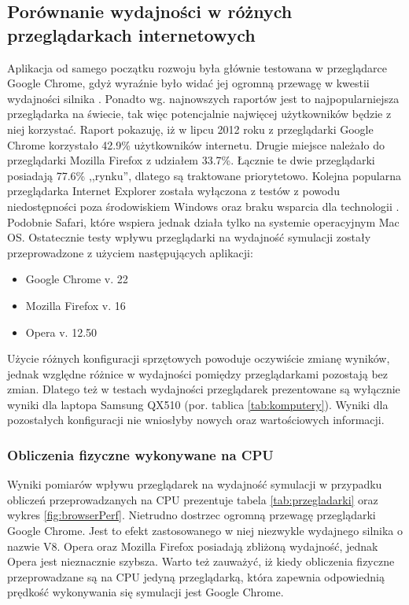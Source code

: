 \subsection{Porównanie wydajności w różnych przeglądarkach internetowych}
\label{sec:przegladarkiWyd}

Aplikacja od samego początku rozwoju była głównie testowana w przeglądarce
Google Chrome, gdyż wyraźnie było widać jej ogromną przewagę w kwestii
wydajności silnika \js. Ponadto wg. najnowszych raportów jest to
najpopularniejsza przeglądarka na świecie, tak więc potencjalnie najwięcej
użytkowników \en będzie z niej korzystać. Raport \cite{BrowserStats} pokazuję,
iż w lipcu 2012 roku z przeglądarki Google Chrome korzystało 42.9\%
użytkowników internetu. Drugie miejsce należało do przeglądarki Mozilla
Firefox z udziałem 33.7\%. Łącznie te dwie przeglądarki posiadają 77.6\%
,,rynku'', dlatego są traktowane priorytetowo. Kolejna popularna przeglądarka
Internet Explorer została wyłączona z testów z powodu niedostępności poza
środowiskiem Windows oraz braku wsparcia dla technologii . Podobnie
Safari, które wspiera  jednak działa tylko na systemie operacyjnym
Mac OS. Ostatecznie testy wpływu przeglądarki na wydajność symulacji zostały
przeprowadzone z użyciem następujących aplikacji:

\begin{itemize}
\item Google Chrome v. 22
\item Mozilla Firefox v. 16
\item Opera v. 12.50
\end{itemize}

Użycie różnych konfiguracji sprzętowych powoduje oczywiście zmianę wyników,
jednak względne różnice w wydajności pomiędzy przeglądarkami pozostają bez
zmian. Dlatego też w testach wydajności przeglądarek prezentowane są wyłącznie
wyniki dla laptopa Samsung QX510 (por. tablica \ref{tab:komputery}). Wyniki
dla pozostałych konfiguracji nie wniosłyby nowych oraz wartościowych
informacji.

\subsubsection{Obliczenia fizyczne wykonywane na CPU}

Wyniki pomiarów wpływu przeglądarek na wydajność symulacji w przypadku
obliczeń przeprowadzanych na CPU prezentuje tabela \ref{tab:przegladarki} oraz
wykres \ref{fig:browserPerf}. Nietrudno dostrzec ogromną przewagę przeglądarki
Google Chrome. Jest to efekt zastosowanego w niej niezwykle wydajnego silnika
 o nazwie V8. Opera oraz Mozilla Firefox posiadają zbliżoną
wydajność, jednak Opera jest nieznacznie szybsza. Warto też zauważyć, iż kiedy
obliczenia fizyczne przeprowadzane są na CPU jedyną przeglądarką, która
zapewnia odpowiednią prędkość wykonywania się symulacji jest Google Chrome.

